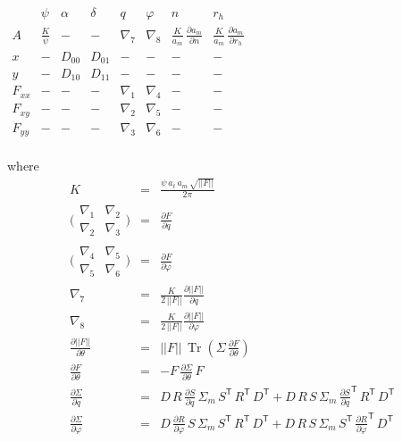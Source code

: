 \documentclass[modern]{aastex6}
\newcommand{\transpose}[1]{{#1}^{\!\mathsf T}}
\renewcommand{\det}[1]{||{#1}||}
\DeclareMathOperator{\trace}{Tr}
\begin{document}
\begin{center}
$
\begin{array}{c|ccccccc}
 & \psi & \alpha & \delta & q & \varphi & n & r_h \\
\hline
A      &  \frac{K}{\psi} & -      & -      & \nabla_7 & \nabla_8 &  \frac{K}{a_m}\, \frac{\partial a_m}{\partial n} & \frac{K}{a_m} \,\frac{\partial a_m}{\partial r_h} \\
x      & -         & D_{00} & D_{01} & -        & -        & -               & - \\
y      & -         & D_{10} & D_{11} & -        & -        & -               & - \\
F_{xx} & -         & -      & -      & \nabla_1 & \nabla_4 & -               & - \\
F_{xy} & -         & -      & -      & \nabla_2 & \nabla_5 & -               & - \\
F_{yy} & -         & -      & -      & \nabla_3 & \nabla_6 & -               & - \\
\end{array}
$
\end{center}

where
\begin{eqnarray}
K & = & \frac{\psi \, a_\ell \, a_m \, \sqrt{\det{F}}}{2\pi} \nonumber \\
\bigl(
  \begin{smallmatrix}
    {\nabla_1} & {\nabla_2} \\
    {\nabla_2} & {\nabla_3}
  \end{smallmatrix}
\bigr)
  & = & \frac{\partial F}{\partial q} \nonumber \\
\bigl(
  \begin{smallmatrix}
    {\nabla_4} & {\nabla_5} \\
    {\nabla_5} & {\nabla_6}
  \end{smallmatrix}
\bigr)
  & = & \frac{\partial F}{\partial \varphi} \nonumber \\
\nabla_7 & = & \frac{ K }{2 \, \det{F}}\frac{\partial\det{F}}{\partial q} \nonumber \\
\nabla_8 & = & \frac{ K }{2 \, \det{F}}\frac{\partial\det{F}}{\partial \varphi} \nonumber \\
\frac{\partial \det{F}}{\partial \theta} & = & \det{F}\, \trace(\Sigma \, \frac{\partial F}{\partial\theta}) \nonumber \\
\frac{\partial F}{\partial \theta} & = & -F\, \frac{\partial \Sigma}{\partial \theta} \, F \nonumber \\
\frac{\partial \Sigma}{\partial q} & = & D\, R\, \frac{\partial S}{\partial q} \, \Sigma_m \, \transpose{S} \, \transpose{R} \, \transpose{D} + D\, R\, S \, \Sigma_m \, \transpose{\frac{\partial S}{\partial q}} \, \transpose{R} \, \transpose{D} \nonumber \\
\frac{\partial \Sigma}{\partial \varphi} & = & D\, \frac{\partial R}{\partial \varphi} \, S\, \Sigma_m \, \transpose{S} \, \transpose{R} \, \transpose{D} +  D\, R\, S \, \Sigma_m \, \transpose{S} \, \transpose{\frac{\partial R}{\partial \varphi}} \, \transpose{D} \nonumber \\
\end{eqnarray}
\end{document}
